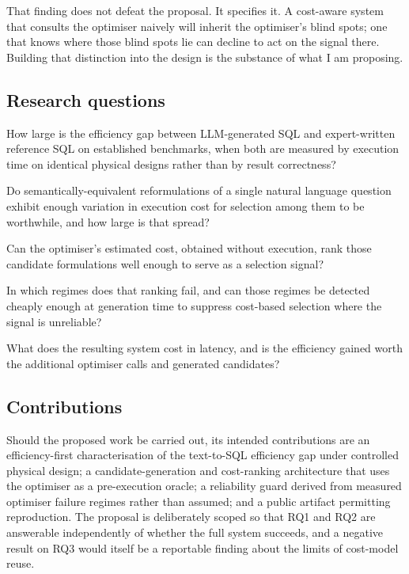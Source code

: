 \documentclass[12pt, a4paper]{article}
\begin{document}
That finding does not defeat the proposal. It specifies it. A
cost-aware system that consults the optimiser naively will inherit the
optimiser's blind spots; one that knows where those blind spots lie can
decline to act on the signal there. Building that distinction into the
design is the substance of what I am proposing.

\subsection{Research questions}
\label{sec:rqs}

\begin{description}[leftmargin=2.1cm, style=nextline, font=\bfseries]
\item[RQ1] How large is the efficiency gap between LLM-generated SQL and
expert-written reference SQL on established benchmarks, when both are
measured by execution time on identical physical designs rather than by
result correctness?

\item[RQ2] Do semantically-equivalent reformulations of a single natural
language question exhibit enough variation in execution cost for
selection among them to be worthwhile, and how large is that spread?

\item[RQ3] Can the optimiser's estimated cost, obtained without
execution, rank those candidate formulations well enough to serve as a
selection signal?

\item[RQ4] In which regimes does that ranking fail, and can those regimes
be detected cheaply enough at generation time to suppress cost-based
selection where the signal is unreliable?

\item[RQ5] What does the resulting system cost in latency, and is the
efficiency gained worth the additional optimiser calls and generated
candidates?
\end{description}

\subsection{Contributions}
\label{sec:contrib}

Should the proposed work be carried out, its intended contributions are
an efficiency-first characterisation of the text-to-SQL efficiency gap
under controlled physical design; a candidate-generation and cost-ranking
architecture that uses the optimiser as a pre-execution oracle; a
reliability guard derived from measured optimiser failure regimes rather
than assumed; and a public artifact permitting reproduction. The
proposal is deliberately scoped so that RQ1 and RQ2 are answerable
independently of whether the full system succeeds, and a negative
result on RQ3 would itself be a reportable finding about the limits of
cost-model reuse.
\end{document}
